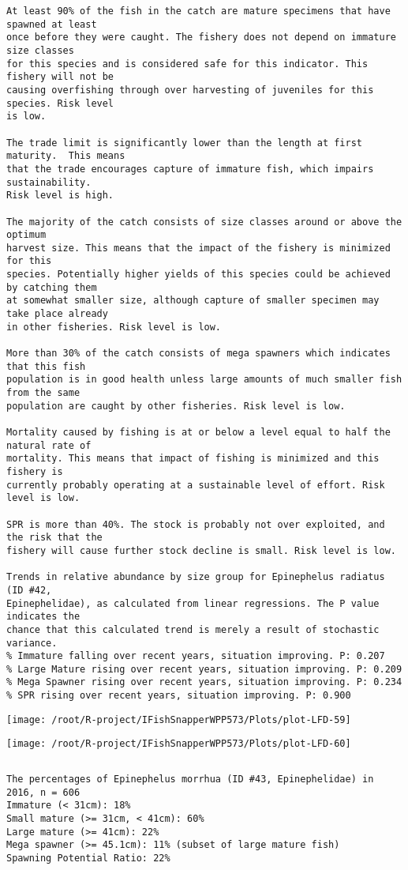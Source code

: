 \documentclass{report}\usepackage[]{graphicx}\usepackage[]{color}
\makeatletter
\def\maxwidth{ %
  \ifdim\Gin@nat@width>\linewidth
    \linewidth
  \else
    \Gin@nat@width
  \fi
}
\newenvironment{kframe}{%
 \def\at@end@of@kframe{}%
 \ifinner\ifhmode%
  \def\at@end@of@kframe{\end{minipage}}%
  \begin{minipage}{\columnwidth}%
 \fi\fi%
 \def\FrameCommand##1{\hskip\@totalleftmargin \hskip-\fboxsep
 \colorbox{shadecolor}{##1}\hskip-\fboxsep
     \hskip-\linewidth \hskip-\@totalleftmargin \hskip\columnwidth}%
 \MakeFramed {\advance\hsize-\width
   \@totalleftmargin\z@ \linewidth\hsize
   \@setminipage}}%
 {\par\unskip\endMakeFramed%
 \at@end@of@kframe}
\newenvironment{knitrout}{}{} %
\makeatother
\begin{document}
\begin{knitrout}
\begin{kframe}
\begin{verbatim}
At least 90% of the fish in the catch are mature specimens that have spawned at least
once before they were caught. The fishery does not depend on immature size classes
for this species and is considered safe for this indicator. This fishery will not be
causing overfishing through over harvesting of juveniles for this species. Risk level
is low.

The trade limit is significantly lower than the length at first maturity.  This means
that the trade encourages capture of immature fish, which impairs sustainability.
Risk level is high.

The majority of the catch consists of size classes around or above the optimum
harvest size. This means that the impact of the fishery is minimized for this
species. Potentially higher yields of this species could be achieved by catching them
at somewhat smaller size, although capture of smaller specimen may take place already
in other fisheries. Risk level is low.

More than 30% of the catch consists of mega spawners which indicates that this fish
population is in good health unless large amounts of much smaller fish from the same
population are caught by other fisheries. Risk level is low.
 
Mortality caused by fishing is at or below a level equal to half the natural rate of
mortality. This means that impact of fishing is minimized and this fishery is
currently probably operating at a sustainable level of effort. Risk level is low.
 
SPR is more than 40%. The stock is probably not over exploited, and the risk that the
fishery will cause further stock decline is small. Risk level is low.
 
Trends in relative abundance by size group for Epinephelus radiatus (ID #42,
Epinephelidae), as calculated from linear regressions. The P value indicates the
chance that this calculated trend is merely a result of stochastic variance.
% Immature falling over recent years, situation improving. P: 0.207
% Large Mature rising over recent years, situation improving. P: 0.209
% Mega Spawner rising over recent years, situation improving. P: 0.234
% SPR rising over recent years, situation improving. P: 0.900
\end{verbatim}
\end{kframe}
\texttt{[image: /root/R-project/IFishSnapperWPP573/Plots/plot-LFD-59]} 

\texttt{[image: /root/R-project/IFishSnapperWPP573/Plots/plot-LFD-60]} 
\begin{kframe}\begin{verbatim}
\end{verbatim}
\end{kframe}
\clearpage
\newpage
\begin{kframe}\begin{verbatim}The percentages of Epinephelus morrhua (ID #43, Epinephelidae) in 2016, n = 606
Immature (< 31cm): 18%
Small mature (>= 31cm, < 41cm): 60%
Large mature (>= 41cm): 22%
Mega spawner (>= 45.1cm): 11% (subset of large mature fish)
Spawning Potential Ratio: 22%
 

\end{verbatim}
\end{kframe}
\end{knitrout}
\end{document}
